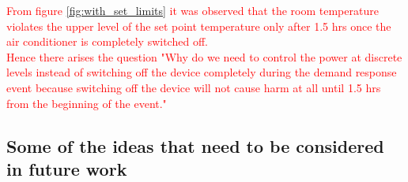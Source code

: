 \documentclass[12pt,a4paper]{article}
\begin{document}
\textcolor{red}{From figure \ref{fig:with_set_limits} it was observed that the room temperature violates the upper level of the set point temperature only after 1.5 hrs once the air conditioner is completely switched off.} \\

\textcolor{red}{Hence there arises the question "Why do we need to control the power at discrete levels instead of switching off the device completely during the demand response event because switching off the device will not cause harm at all until 1.5 hrs from the beginning of the event."}




\subsection*{Some of the ideas that need to be considered in future work}
\end{document}
